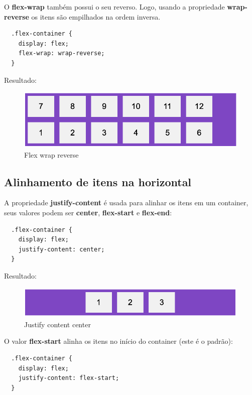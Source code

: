 O \textbf{flex-wrap} também possui o seu reverso. Logo, usando a propriedade \textbf{wrap-reverse} os itens são empilhados na ordem inversa.

\begin{lstlisting}
  .flex-container {
    display: flex;
    flex-wrap: wrap-reverse;
  } 
\end{lstlisting}

Resultado: 

\begin{figure}[H]
  \centering
  \includegraphics[scale=0.4]{imagens/flex-wrap-reverse.png}
  \caption{Flex wrap reverse}
  \label{fig:model-flexbox}
\end{figure}

\subsection{Alinhamento de itens na horizontal}

A propriedade \textbf{justify-content} é usada para alinhar os itens em um container, seus valores podem ser \textbf{center}, \textbf{flex-start} e \textbf{flex-end}:

\begin{lstlisting}
  .flex-container {
    display: flex;
    justify-content: center;
  } 
\end{lstlisting}

Resultado: 

\begin{figure}[H]
  \centering
  \includegraphics[scale=0.4]{imagens/justify-content-center.png}
  \caption{Justify content center}
  \label{fig:model-flexbox}
\end{figure}

O valor \textbf{flex-start} alinha os itens no início do container (este é o padrão):

\begin{lstlisting}
  .flex-container {
    display: flex;
    justify-content: flex-start;
  } 
\end{lstlisting}

